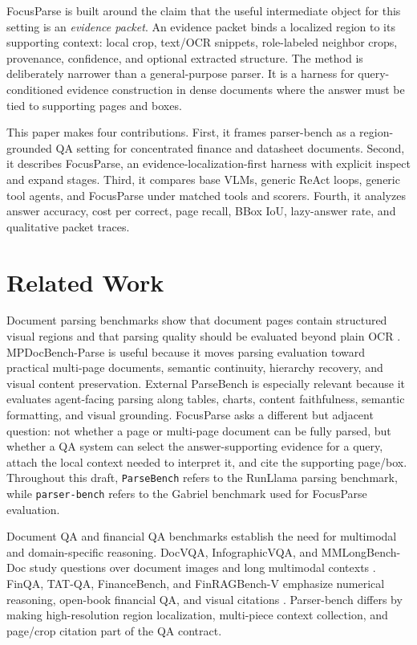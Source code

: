 \documentclass[10pt]{article}
\begin{document}
FocusParse is built around the claim that the useful intermediate object for
this setting is an \emph{evidence packet}. An evidence packet binds a localized
region to its supporting context: local crop, text/OCR snippets, role-labeled
neighbor crops, provenance, confidence, and optional extracted structure. The
method is deliberately narrower than a general-purpose parser. It is a harness
for query-conditioned evidence construction in dense documents where the answer
must be tied to supporting pages and boxes.

This paper makes four contributions. First, it frames parser-bench as a
region-grounded QA setting for concentrated finance and datasheet documents.
Second, it describes FocusParse, an evidence-localization-first harness with
explicit inspect and expand stages. Third, it compares base VLMs, generic ReAct
loops, generic tool agents, and FocusParse under matched tools and scorers.
Fourth, it analyzes answer accuracy, cost per correct, page recall, BBox IoU,
lazy-answer rate, and qualitative packet traces.

\section{Related Work}

Document parsing benchmarks show that document pages contain structured visual
regions and that parsing quality should be evaluated beyond plain OCR
\cite{doclaynet2022,pubtabnet2020,gtefintabnet2021,omnidocbench2025,mpdocbenchparse2026,parsebench2026}.
MPDocBench-\allowbreak Parse is useful because it moves parsing evaluation toward practical
multi-page documents, semantic continuity, hierarchy recovery, and visual
content preservation. External ParseBench is especially relevant because it
evaluates agent-facing parsing along tables, charts, content faithfulness,
semantic formatting, and visual grounding. FocusParse asks a different but
adjacent question: not whether a page or multi-page document can be fully
parsed, but whether a QA system can select the answer-supporting evidence for a
query, attach the local context needed to interpret it, and cite the supporting
page/box. Throughout this draft, \texttt{ParseBench} refers to the RunLlama
parsing benchmark, while \texttt{parser-bench} refers to the Gabriel benchmark
used for FocusParse evaluation.

Document QA and financial QA benchmarks establish the need for multimodal and
domain-specific reasoning. DocVQA, InfographicVQA, and MMLongBench-Doc study
questions over document images and long multimodal contexts
\cite{docvqa2021,infographicvqa2021,mmlongbenchdoc2024}. FinQA, TAT-QA,
FinanceBench, and FinRAGBench-V emphasize numerical reasoning, open-book
financial QA, and visual citations
\cite{finqa2021,tatqa2021,financebench2023,finragbenchv2025}. Parser-bench
differs by making high-resolution region localization, multi-piece context
collection, and page/crop citation part of the QA contract.
\end{document}
